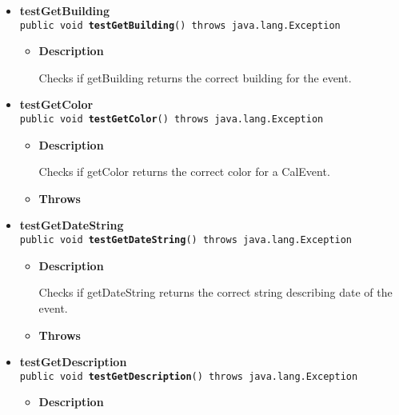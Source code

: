 \documentclass[11pt,a4paper]{report}
\begin{document}
{{{\begin{itemize}
{\begin{itemize}
{Checks if equals does correct checks
}
\item{{\bf  Throws}
}%
\end{itemize}
}%
\item{ 
{\bf  testGetBuilding}\\
\texttt{public void\ {\bf  testGetBuilding}() throws java.lang.Exception
\label{is.mpg.ruglan.test.CalEventTest.testGetBuilding()}}%
\begin{itemize}
\item{
{\bf  Description}

Checks if getBuilding returns the correct building for the event.
}
\end{itemize}
}%
\item{ 
{\bf  testGetColor}\\
\texttt{public void\ {\bf  testGetColor}() throws java.lang.Exception
\label{is.mpg.ruglan.test.CalEventTest.testGetColor()}}%
\begin{itemize}
\item{
{\bf  Description}

Checks if getColor returns the correct color for a CalEvent.
}
\item{{\bf  Throws}
}%
\end{itemize}
}%
\item{ 
{\bf  testGetDateString}\\
\texttt{public void\ {\bf  testGetDateString}() throws java.lang.Exception
\label{is.mpg.ruglan.test.CalEventTest.testGetDateString()}}%
\begin{itemize}
\item{
{\bf  Description}

Checks if getDateString returns the correct string describing date of the event.
}
\item{{\bf  Throws}
}%
\end{itemize}
}%
\item{ 
{\bf  testGetDescription}\\
\texttt{public void\ {\bf  testGetDescription}() throws java.lang.Exception
\label{is.mpg.ruglan.test.CalEventTest.testGetDescription()}}%
\begin{itemize}
\item{
{\bf  Description}

}
\end{itemize}}
\end{itemize}}}}
\end{document}
